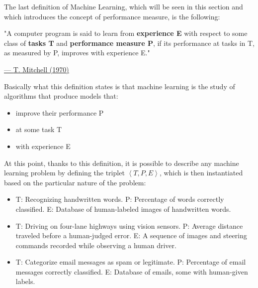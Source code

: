 \newpage

The last definition of Machine Learning, which will be seen in this
section and which introduces the concept of performance measure, is the
following:

\vspace{5mm}

\begin{quoting}
    "A computer program is said to learn from \textbf{experience E} with
    respect to some class of \textbf{tasks T} and \textbf{performance
        measure P}, if its performance at tasks in T, as measured by P,
    improves with experience E."
\end{quoting}

\hspace{310pt}
\href{https://en.wikipedia.org/wiki/Tom_M._Mitchell}{--- \underline{T. Mitchell (1970)}}

\vspace{10mm}

Basically what this definition states is that machine learning is the
study of algorithms that produce models that:

\begin{itemize}
    \item improve their performance P
    \item at some task T
    \item with experience E
\end{itemize}

\vspace{5mm}

At this point, thanks to this definition, it is possible to describe any
machine learning problem by defining the triplet
$\left\langle T,P,E\right\rangle$,
which is then instantiated based on the particular
nature of the problem:

\begin{itemize}
    \item
          \begin{example}
              T: Recognizing handwritten words.
              P: Percentage of words correctly classified.
              E: Database of human-labeled images of handwritten words.
          \end{example}
    \item
          \begin{example}
              T: Driving on four-lane highways using vision sensors.
              P: Average distance traveled before a human-judged error.
              E: A sequence of images and steering commands recorded
              while observing a human driver.
          \end{example}
    \item
          \begin{example}
              T: Categorize email messages as spam or legitimate.
              P: Percentage of email messages correctly classified.
              E: Database of emails, some with human-given labels.
          \end{example}
\end{itemize}

